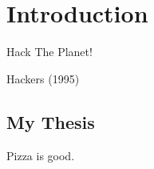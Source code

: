 
\chapter{Introduction}\label{ch:intro}

\epigraph{
  Hack The Planet!
}{
  Hackers (1995)
}

\section{My Thesis}\label{sec:intro:thesis}

Pizza is good.
